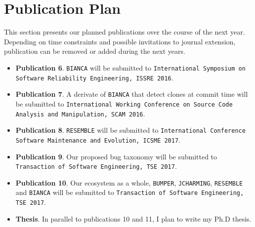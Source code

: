 \section{Publication Plan\label{sec:publication-plan}}

This section presents our planned publications over the course of the next year.
Depending on time constraints and possible invitations to journal extension, publication can be removed or added during the next years.

\begin{itemize}

	\item {\bf Publication 6}. {\tt BIANCA} will be submitted to {\tt International Symposium on Software Reliability Engineering, ISSRE 2016}.
	\item {\bf Publication 7}. A derivate of {\tt BIANCA} that detect clones at commit time will be submitted to {\tt International Working Conference on Source Code Analysis and Manipulation, SCAM 2016}.
	\item {\bf Publication 8}. {\tt RESEMBLE} will be submitted to {\tt International Conference Software Maintenance and Evolution, ICSME 2017}.
	\item {\bf Publication 9}. Our proposed bug taxonomy will be submitted to {\tt Transaction of Software Engineering, TSE 2017}.
	\item {\bf Publication 10}. Our ecosystem as a whole, {\tt BUMPER}, {\tt JCHARMING}, {\tt RESEMBLE} and {\tt BIANCA} will be submitted to {\tt Transaction of Software Engineering, TSE 2017}.
	\item {\bf Thesis}. In parallel to publications 10 and 11, I plan to write my Ph.D thesis.
\end{itemize}
